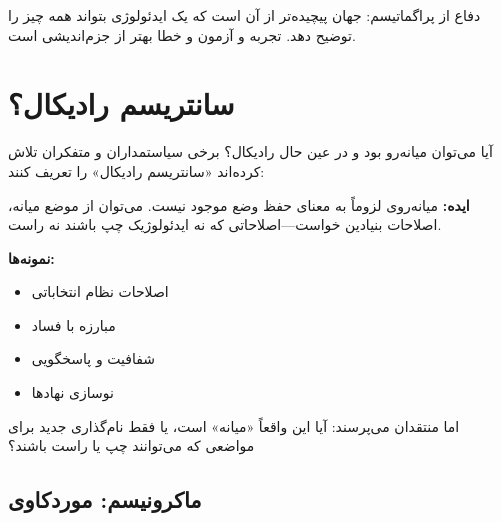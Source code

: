 دفاع از پراگماتیسم: جهان پیچیده‌تر از آن است که یک ایدئولوژی بتواند همه چیز را توضیح دهد. تجربه و آزمون و خطا بهتر از جزم‌اندیشی است.


\section{سانتریسم رادیکال؟}


آیا می‌توان میانه‌رو بود و در عین حال رادیکال؟ برخی سیاستمداران و متفکران تلاش کرده‌اند «سانتریسم رادیکال» را تعریف کنند:

\textbf{ایده:} میانه‌روی لزوماً به معنای حفظ وضع موجود نیست. می‌توان از موضع میانه، اصلاحات بنیادین خواست—اصلاحاتی که نه ایدئولوژیک چپ باشند نه راست.

\textbf{نمونه‌ها:}
\begin{itemize}
    \item اصلاحات نظام انتخاباتی
    \item مبارزه با فساد
    \item شفافیت و پاسخگویی
    \item نوسازی نهادها
\end{itemize}

اما منتقدان می‌پرسند: آیا این واقعاً «میانه» است، یا فقط نام‌گذاری جدید برای مواضعی که می‌توانند چپ یا راست باشند؟


\subsection{ماکرونیسم: موردکاوی}

